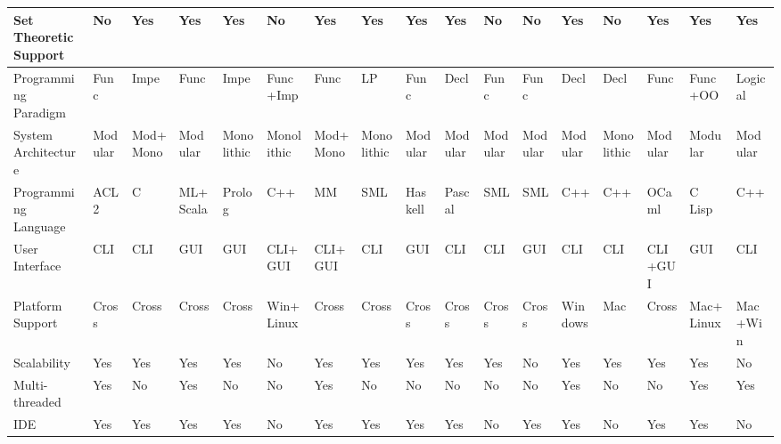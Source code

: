 \begin{table}[!ht]
{\begin{tabular}{|p{3cm}|p{0.8cm}|p{0.8cm}|p{0.8cm}|p{0.8cm}|p{0.8cm}|p{0.8cm}|p{0.8cm}|p{0.8cm}|p{0.8cm}|p{0.8cm}|p{0.8cm}|p{0.9cm}|p{0.8cm}|p{0.8cm}|p{0.8cm}|p{0.8cm}|}
  Set Theoretic Support & \tiny{No} & \tiny{Yes} & \tiny{Yes} & \tiny{Yes} & \tiny{No} & \tiny{Yes}& \tiny{Yes} & \tiny{Yes} & \tiny{Yes} & \tiny{No} & \tiny{No} & \tiny{Yes} & \tiny{No} & \tiny{Yes} & \tiny{Yes}  & \tiny{Yes}\\   \hline
  Programming Paradigm & \tiny{Func} & \tiny{Impe} & \tiny{Func} & \tiny{Impe} & \tiny{Func+Imp} & \tiny{Func} & \tiny{LP} & \tiny{Func} & \tiny{Decl} & \tiny{Func} & \tiny{Func} & \tiny{Decl} & \tiny{Decl} & \tiny{Func} & \tiny{Func+OO} & \tiny{Logical}\\   \hline
  System Architecture & \tiny{Modular} & \tiny{Mod+Mono} & \tiny{Modular} & \tiny{Monolithic} & \tiny{Monolithic} & \tiny{Mod+Mono} & \tiny{Monolithic} & \tiny{Modular} & \tiny{Modular} & \tiny{Modular} & \tiny{Modular} & \tiny{Modular} & \tiny{Monolithic} & \tiny{Modular} & \tiny{Modular} & \tiny{Modular}\\   \hline
  Programming Language & \tiny{ACL2} & \tiny{C} & \tiny{ML+Scala} & \tiny{Prolog} & \tiny{C++} & \tiny{MM} & \tiny{SML} & \tiny{Haskell} & \tiny{Pascal} & \tiny{SML} & \tiny{SML} & \tiny{C++} & \tiny{C++} & \tiny{OCaml} & \tiny{C Lisp} & \tiny{C++}\\   \hline
  User Interface & \tiny{CLI} & \tiny{CLI} & \tiny{GUI} & \tiny{GUI} & \tiny{CLI+GUI} & \tiny{CLI+GUI} & \tiny{CLI} & \tiny{GUI} & \tiny{CLI} & \tiny{CLI} & \tiny{GUI} & \tiny{CLI} & \tiny{CLI} & \tiny{CLI+GUI} & \tiny{GUI} & \tiny{CLI} \\   \hline
  Platform Support & \tiny{Cross} & \tiny{Cross} & \tiny{Cross} & \tiny{Cross} & \tiny{Win+Linux} & \tiny{Cross} & \tiny{Cross} & \tiny{Cross} & \tiny{Cross} & \tiny{Cross} & \tiny{Cross} & \tiny{Windows} & \tiny{Mac} & \tiny{Cross} & \tiny{Mac+Linux} & \tiny{Mac+Win}\\   \hline
  Scalability & \tiny{Yes} & \tiny{Yes} & \tiny{Yes} & \tiny{Yes} & \tiny{No} & \tiny{Yes} & \tiny{Yes} & \tiny{Yes} & \tiny{Yes} & \tiny{Yes} & \tiny{No} & \tiny{Yes} & \tiny{Yes} & \tiny{Yes} & \tiny{Yes} & \tiny{No}\\   \hline
  Multi-threaded & \tiny{Yes} & \tiny{No} & \tiny{Yes} & \tiny{No} & \tiny{No} & \tiny{Yes} & \tiny{No} & \tiny{No} & \tiny{No} & \tiny{No} & \tiny{No} & \tiny{Yes} & \tiny{No} & \tiny{No} & \tiny{Yes}& \tiny{Yes}\\   \hline
  IDE & \tiny{Yes} & \tiny{Yes} & \tiny{Yes} & \tiny{Yes} & \tiny{No} & \tiny{Yes} & \tiny{Yes} & \tiny{Yes} & \tiny{Yes} & \tiny{No} & \tiny{Yes} & \tiny{Yes} & \tiny{No} & \tiny{Yes} & \tiny{Yes} & \tiny{No}\\   \hline

\end{tabular}}
\end{table}
